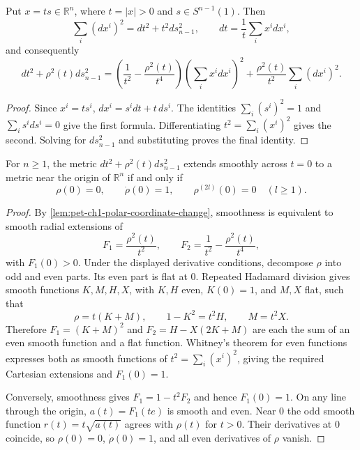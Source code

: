 \begin{lemma}
  \label{lem:pet-ch1-polar-coordinate-change}
  \leanok
  Put $x=ts\in\mathbb{R}^n$, where $t=|x|>0$ and
  $s\in S^{n-1}(1)$. Then
  \[
    \sum_i(dx^i)^2=dt^2+t^2ds_{n-1}^2,
    \qquad dt=\frac1t\sum_i x^i dx^i,
  \]
  and consequently
  \[
    dt^2+\rho^2(t)ds_{n-1}^2
      =\left(\frac1{t^2}-\frac{\rho^2(t)}{t^4}\right)
         \left(\sum_i x^i dx^i\right)^2
       +\frac{\rho^2(t)}{t^2}\sum_i(dx^i)^2.
  \]
\end{lemma}
\begin{proof}
  \leanok
  \sketch
  Since $x^i=ts^i$,
  $dx^i=s^i dt+t\,ds^i$. The identities
  $\sum_i(s^i)^2=1$ and $\sum_i s^i ds^i=0$ give the first formula.
  Differentiating $t^2=\sum_i(x^i)^2$ gives the second. Solving for
  $ds_{n-1}^2$ and substituting proves the final identity.
\end{proof}

\begin{theorem}
  \label{thm:pet-ch1-smoothness-criterion}
  \leanok
  For $n\ge1$, the metric
  $dt^2+\rho^2(t)ds_{n-1}^2$ extends smoothly across $t=0$ to a metric near
  the origin of $\mathbb{R}^n$ if and only if
  \[
    \rho(0)=0,
    \qquad \dot\rho(0)=1,
    \qquad \rho^{(2l)}(0)=0\quad(l\ge1).
  \]
\end{theorem}
\begin{proof}
  \leanok
  \sketch
  By \cref{lem:pet-ch1-polar-coordinate-change}, smoothness is equivalent to
  smooth radial extensions of
  \[
    F_1=\frac{\rho^2(t)}{t^2},
    \qquad
    F_2=\frac1{t^2}-\frac{\rho^2(t)}{t^4},
  \]
  with $F_1(0)>0$. Under the displayed derivative conditions, decompose
  $\rho$ into odd and even parts. Its even part is flat at $0$. Repeated
  Hadamard division gives smooth functions $K,M,H,X$, with $K,H$ even,
  $K(0)=1$, and $M,X$ flat, such that
  \[
    \rho=t(K+M),\qquad 1-K^2=t^2H,
    \qquad M=t^2X.
  \]
  Therefore $F_1=(K+M)^2$ and $F_2=H-X(2K+M)$ are each the sum of an even
  smooth function and a flat function. Whitney's theorem for even functions
  expresses both as smooth functions of $t^2=\sum_i(x^i)^2$, giving the
  required Cartesian extensions and $F_1(0)=1$.

  Conversely, smoothness gives $F_1=1-t^2F_2$ and hence $F_1(0)=1$. On any
  line through the origin, $a(t)=F_1(te)$ is smooth and even. Near $0$ the
  odd smooth function $r(t)=t\sqrt{a(t)}$ agrees with $\rho(t)$ for $t>0$.
  Their derivatives at $0$ coincide, so $\rho(0)=0$, $\dot\rho(0)=1$, and
  all even derivatives of $\rho$ vanish.
\end{proof}

